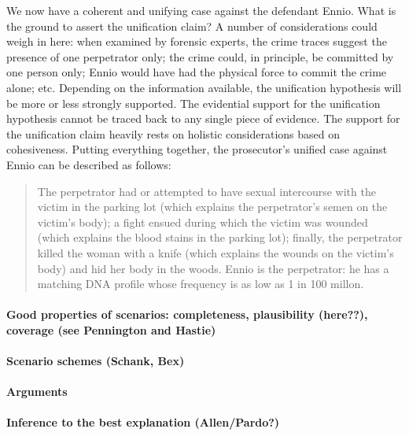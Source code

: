 \documentclass[10pt]{article}
\begin{document}
We now have a coherent and unifying case against the defendant Ennio.
What is the ground to assert the unification claim? A number of considerations could 
weigh in here: when examined by forensic experts, the crime traces suggest the presence of one perpetrator only; the crime could, in principle, be committed by one person only; Ennio would have had the physical force to commit the crime alone; etc. Depending on the information available, the unification hypothesis will be 
more or less strongly supported. The evidential support for the unification hypothesis cannot be traced back to any single piece of evidence. The support for the unification claim heavily
rests on holistic considerations based on cohesiveness.
Putting everything together, the prosecutor's unified case against 
Ennio can be described as follows:
%
\begin{quote}
\begin{singlespace}
The perpetrator  had or attempted to have sexual intercourse with the victim in the parking lot (which explains the perpetrator's 
semen on the victim's body); a fight ensued during which the victim was wounded (which explains the blood stains in the parking lot); finally, the perpetrator killed the woman with a knife (which explains the wounds on the victim's body) and hid her body in the woods. 
Ennio is the perpetrator: he has a matching DNA profile whose frequency is as low as 1 in 100 millon.
\end{singlespace}
\end{quote}
%



\paragraph{	Good properties of scenarios: completeness, plausibility (here??), coverage (see Pennington and Hastie)}

\paragraph{	Scenario schemes (Schank, Bex)}

\paragraph{Arguments}

\paragraph{Inference to the best explanation (Allen/Pardo?)}
\end{document}
